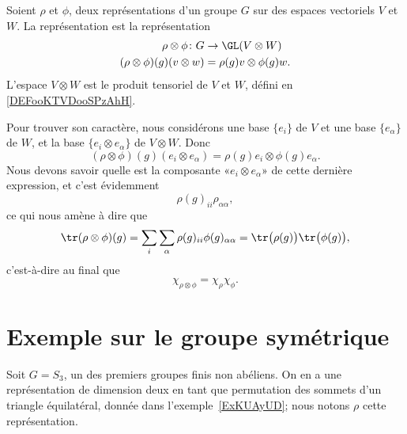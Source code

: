 \begin{definition}
	Soient \( \rho\) et \( \phi\), deux représentations d'un groupe \( G\) sur des espaces vectoriels \( V\) et \( W\). La représentation  est la représentation
	\begin{equation}
		\begin{aligned}
			\rho\otimes\phi\colon G          & \to \GL(V\otimes W)        \\
			(\rho\otimes\phi)(g)(v\otimes w) & =\rho(g)v\otimes \phi(g)w.
		\end{aligned}
	\end{equation}
	L'espace \( V\otimes W\) est le produit tensoriel de \( V\) et \( W\), défini en \ref{DEFooKTVDooSPzAhH}.
\end{definition}
Pour trouver son caractère, nous considérons une base \( \{ e_i \}\) de \( V\) et une base \( \{ e_{\alpha} \}\) de \( W\), et la base \( \{ e_i\otimes e_{\alpha} \}\) de \( V\otimes W\). Donc
\begin{equation}
	(\rho\otimes \phi)(g)(e_i\otimes e_{\alpha})=\rho(g)e_i\otimes \phi(g)e_{\alpha}.
\end{equation}
Nous devons savoir quelle est la composante «\( e_i\otimes e_{\alpha}\)» de cette dernière expression, et c'est évidemment
\begin{equation}
	\rho(g)_{ii}\rho_{\alpha\alpha},
\end{equation}
ce qui nous amène à dire que
\begin{equation}
	\tr(\rho\otimes \phi)(g)=\sum_i\sum_{\alpha}\rho(g)_{ii}\phi(g)_{\alpha\alpha}=\tr\big( \rho(g) \big)\tr\big( \phi(g) \big),
\end{equation}
c'est-à-dire au final que
\begin{equation}    \label{EqOTmvfjf}
	\chi_{\rho\otimes \phi}=\chi_{\rho}\chi_{\phi}.
\end{equation}

\section{Exemple sur le groupe symétrique}

Soit \( G=S_3\), un des premiers groupes finis non abéliens. On en a une représentation de dimension deux en tant que permutation des sommets d'un triangle équilatéral, donnée dans l'exemple~\ref{ExKUAyUD}; nous notons \( \rho\) cette représentation.

